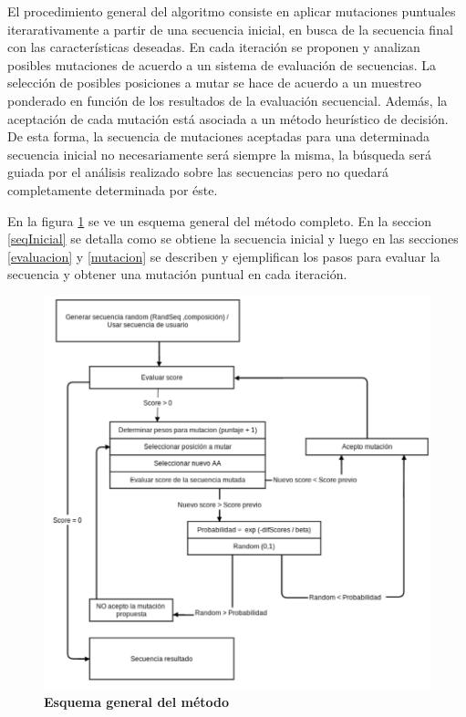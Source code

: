 El procedimiento general del algoritmo consiste en aplicar mutaciones puntuales iterarativamente a partir de una secuencia inicial, en busca de la secuencia final con las características deseadas.
En cada iteración se proponen y analizan posibles mutaciones de acuerdo a un sistema de evaluación de secuencias.
La selección de posibles posiciones a mutar se hace de acuerdo a un muestreo ponderado en función de los resultados de la evaluación secuencial.
Además, la aceptación de cada mutación está asociada a un método heurístico de decisión.
De esta forma, la secuencia de mutaciones aceptadas para una determinada secuencia inicial no necesariamente será siempre la misma, 
la búsqueda será guiada por el análisis realizado sobre las secuencias pero no quedará completamente determinada por éste. 

En la figura \ref{fig:esquema-algoritmo} se ve un esquema general del método completo. 
En la seccion \ref{seqInicial} se detalla como se obtiene la secuencia inicial y luego en las secciones \ref{evaluacion} y \ref{mutacion} se describen y ejemplifican los pasos para evaluar la secuencia y obtener una mutación puntual 
en cada iteración.


\begin{figure}[h!]
\centering
   \includegraphics[width=\textwidth]{img/diagrama-algoritmo-2.png}
 \caption{\textbf{Esquema general del método}}
 \label{fig:esquema-algoritmo}
\end{figure}

